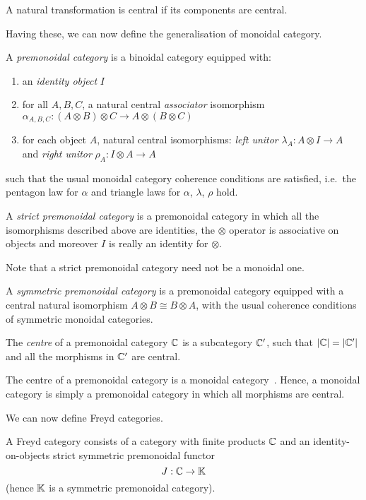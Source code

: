 A natural transformation is central if its components are central.

Having these, we can now define the generalisation of monoidal category.

\begin{definition}
    A \emph{premonoidal category} is a binoidal category equipped with:
    \begin{enumerate}
        \item an \emph{identity object} $I$
        \item for all $A, B, C$, a natural central \emph{associator}
            isomorphism $\alpha_{A,B,C}\colon (A \otimes B) \otimes C \to A
            \otimes (B \otimes C)$
        \item for each object $A$, natural central isomorphisms: \emph{left
            unitor} $\lambda_A\colon A \otimes I \to A$ and \emph{right unitor}
            $\rho_A\colon I \otimes A \to A$
    \end{enumerate}

    such that the usual monoidal category coherence conditions are satisfied,
    i.e.~the pentagon law for $\alpha$ and triangle laws for $\alpha$,
    $\lambda$, $\rho$ hold.

\end{definition}

A \emph{strict premonoidal category} is a premonoidal category in which all the
isomorphisms described above are identities, the $\otimes$ operator is
associative on objects and moreover $I$ is really an identity for $\otimes$.

Note that a strict premonoidal category need not be a monoidal one.

A \emph{symmetric premonoidal category} is a premonoidal category equipped with
a central natural isomorphism $A\otimes B \cong B\otimes A$, with the usual
coherence conditions of symmetric monoidal categories.

The \emph{centre} of a premonoidal category $\mathbb{C}$ is a subcategory $\mathbb{C}'$,
such that $|\mathbb{C}| = |\mathbb{C}'|$ and all the morphisms in $\mathbb{C}'$ are central.

The centre of a premonoidal category is a monoidal
category~\cite[Prop.~3.1]{pow-rob}.
Hence, a monoidal category is simply a premonoidal category in which all
morphisms are central.

We can now define Freyd categories.

\begin{definition}
    A Freyd category consists of a category with finite products $\mathbb{C}$
    and an identity-on-objects strict symmetric premonoidal functor
    \[ J: \mathbb{C} \to \mathbb{K} \]
    (hence $\mathbb{K}$ is a symmetric premonoidal category).
\end{definition}
